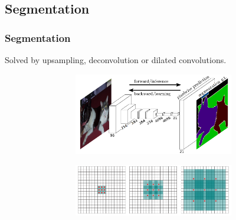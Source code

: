 \documentclass{beamer}
\begin{document}
	\subsection[Segmentation]{Segmentation}
	\begin{frame}
		\frametitle{Segmentation}
		Solved by upsampling, deconvolution or dilated convolutions.
		\begin{figure}
			\centering
			\begin{subfigure}{0.47\textwidth}
				\begin{subfigure}{\textwidth}
					\includegraphics[width=\textwidth]{plots/fcn.png}
				\end{subfigure}
				\par \bigskip
				\begin{subfigure}{\textwidth}
					\includegraphics[width=\textwidth]{plots/dilated.png}
				\end{subfigure}
			\end{subfigure}
			~
			\begin{subfigure}{0.5\textwidth}

\end{subfigure}
\end{figure}
\end{frame}
\end{document}
